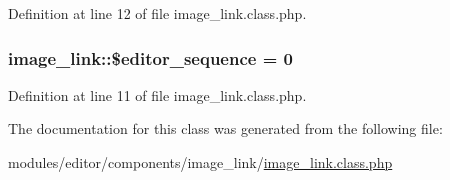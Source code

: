Definition at line 12 of file image\+\_\+link.\+class.\+php.

\hypertarget{classimage__link_af783692826f89b17fa6e9cf21d4f0f8b}{
\subsubsection[{\$editor\+\_\+sequence}]{\setlength{\rightskip}{0pt plus 5cm}image\+\_\+link\+::\$editor\+\_\+sequence = 0}}\label{classimage__link_af783692826f89b17fa6e9cf21d4f0f8b}


Definition at line 11 of file image\+\_\+link.\+class.\+php.



The documentation for this class was generated from the following file\+:\begin{DoxyCompactItemize}
\item 
modules/editor/components/image\+\_\+link/\hyperlink{image__link_8class_8php}{image\+\_\+link.\+class.\+php}\end{DoxyCompactItemize}
